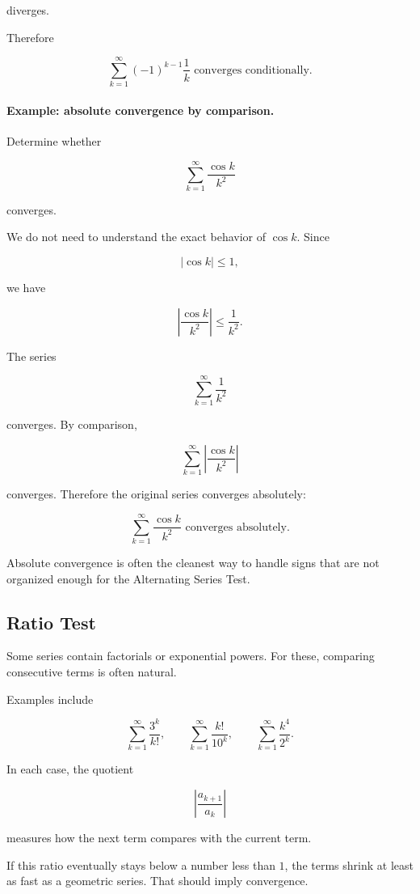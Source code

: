 diverges.

Therefore

\[
\boxed{
\sum_{k=1}^{\infty}(-1)^{k-1}\frac1k
\text{ converges conditionally.}
}
\]

\paragraph{Example: absolute convergence by comparison.}
Determine whether

\[
\sum_{k=1}^{\infty}\frac{\cos k}{k^2}
\]

converges.

We do not need to understand the exact behavior of \(\cos k\).  Since

\[
|\cos k|\le1,
\]

we have

\[
\left|\frac{\cos k}{k^2}\right|
\le
\frac1{k^2}.
\]

The series

\[
\sum_{k=1}^{\infty}\frac1{k^2}
\]

converges.  By comparison,

\[
\sum_{k=1}^{\infty}\left|\frac{\cos k}{k^2}\right|
\]

converges.  Therefore the original series converges absolutely:

\[
\boxed{
\sum_{k=1}^{\infty}\frac{\cos k}{k^2}
\text{ converges absolutely.}
}
\]

Absolute convergence is often the cleanest way to handle signs that are not organized
enough for the Alternating Series Test.

\subsection{Ratio Test}
\label{subsec:ratio-test}

Some series contain factorials or exponential powers.  For these, comparing consecutive
terms is often natural.

Examples include

\[
\sum_{k=1}^{\infty}\frac{3^k}{k!},
\qquad
\sum_{k=1}^{\infty}\frac{k!}{10^k},
\qquad
\sum_{k=1}^{\infty}\frac{k^4}{2^k}.
\]

In each case, the quotient

\[
\left|\frac{a_{k+1}}{a_k}\right|
\]

measures how the next term compares with the current term.

If this ratio eventually stays below a number less than \(1\), the terms shrink at least
as fast as a geometric series.  That should imply convergence.

